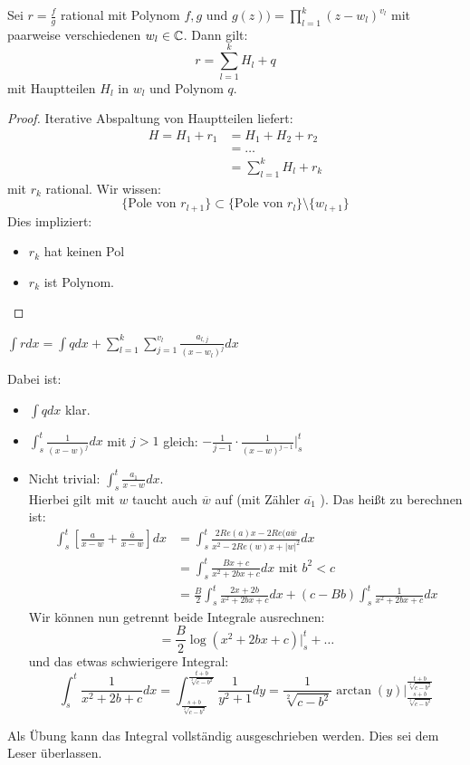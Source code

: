 \begin{theorem}
	Sei $r=\frac{f}{g}$ rational mit Polynom $f,g$ und $g(z))= \prod_{l=1}^{k} (z-w_l)^{v_l} $ mit paarweise verschiedenen $w_l \in \mathbb{C}$. Dann gilt:
	\[
	r= \sum_{l=1}^{k}H_l +q
	\]
mit Hauptteilen $H_l$ in $w_l$ und Polynom $q$.   

\end{theorem}
\begin{proof}
Iterative Abspaltung von Hauptteilen liefert:
\begin{align*}
	H = H_1+r_1 &= H_1+H_2+r_{2} \\
	 &= \ldots \\
	 &= \sum_{l=1}^{k}H_l +r_k
\end{align*}
mit $r_k$ rational. Wir wissen:
\[
	\{\text{Pole von } r_{l+1}\} \subset \{\text{Pole von }r_l\} \setminus \{w_{l+1}\} 
\]
Dies impliziert:
\begin{itemize}
	\item $r_k$ hat keinen Pol
	\item $r_k$ ist Polynom.
\end{itemize}
\end{proof}
\begin{corollary}
	$\int r dx = \int q dx + \sum_{l=1}^{k}\sum_{j=1}^{v_l}\frac{a_{l,j}}{(x-w_l)^j}dx$ 
\end{corollary}
\noindent Dabei ist:
\begin{itemize}
	\item $\int q dx$ klar. 
	\item $\int_{s}^{t} \frac{1}{(x-w)^j}dx$ mit $j>1$ gleich: $ -\frac{1}{j-1}\cdot \frac{1}{(x-w)^{j-1}}\big|_{s}^{t}$  
	\item Nicht trivial: $\int_s^t \frac{a_1}{x-w}dx$. \\
		Hierbei gilt mit $w$ taucht auch $\overline{w}$ auf (mit Zähler $\overline{a_1}$ ). Das heißt zu berechnen ist:
\begin{align*}
	\int_s^t \left[ \frac{a}{x-w}+ \frac{\overline{a}}{x-\overline{w}}\right] dx 
	&= \int_s^t \frac{2Re(a)x-2Re(a\overline{w}}{x^2 - 2Re(w)x+|w|^2}dx \\
	&= \int_s^t \frac{Bx+c}{x^2+2bx+c}dx \text{ mit } b^2 <c \\
	&= \frac{B}{2}\int_s^t \frac{2x+2b}{x^2+2bx+c}dx + (c-Bb) \int_s^t \frac{1}{x^2+2bx+c}dx 
\end{align*}
Wir können nun getrennt beide Integrale ausrechnen:
\[
= \frac{B}{2}\log(x^2+2bx+c)\big|_s^t + \ldots
\]
und das etwas schwierigere Integral:
\[
	\int_s^t \frac{1}{x^2+2b+c}dx= \int_{\frac{s+b}{\sqrt[2]{c-b^2}}}^{\frac{t+b}{\sqrt[2]{c-b^2} }} \frac{1}{y^2+1}dy = \frac{1}{\sqrt[2]{c-b^2}} \arctan(y) \big|_{\frac{s+b}{\sqrt[2]{c-b^2} }}^{\frac{t+b}{\sqrt[2]{c-b^2} }}
\]
\end{itemize}
Als Übung kann das Integral vollständig ausgeschrieben werden. Dies sei dem Leser überlassen.
